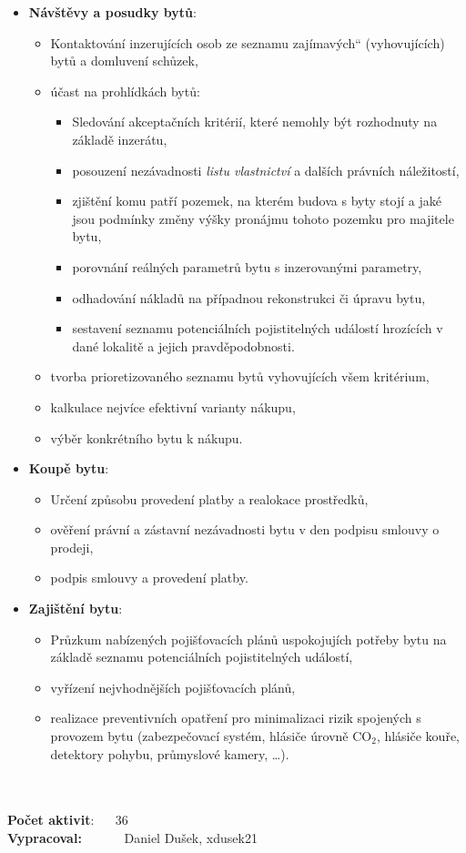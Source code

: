 \documentclass[a4paper,10pt]{article}
\providecommand{\uv}[1]{\quotedblbase #1\textquotedblleft}
\begin{document}
\begin{itemize}
	\item \textbf{Návštěvy a posudky bytů}:
		\begin{itemize}
			\item Kontaktování inzerujících osob ze seznamu \uv{zajímavých} (vyhovujících) bytů a domluvení schůzek,
			\item účast na prohlídkách bytů:
				\begin{itemize}
					\item Sledování akceptačních kritérií, které nemohly být rozhodnuty na základě inzerátu,
					\item posouzení nezávadnosti \textit{listu vlastnictví} a dalších právních náležitostí,
					\item zjištění komu patří pozemek, na kterém budova s byty stojí a jaké jsou podmínky změny výšky pronájmu tohoto pozemku pro majitele bytu,
					\item porovnání reálných parametrů bytu s inzerovanými parametry,
					\item odhadování nákladů na případnou rekonstrukci či úpravu bytu,
					\item sestavení seznamu potenciálních pojistitelných událostí hrozících v dané lokalitě a jejich pravděpodobnosti.
				\end{itemize} 
			\item tvorba prioretizovaného seznamu bytů vyhovujících všem kritérium, 
			\item kalkulace nejvíce efektivní varianty nákupu,
			\item výběr konkrétního bytu k nákupu.
		\end{itemize}

	\item \textbf{Koupě bytu}:
		\begin{itemize}
			\item Určení způsobu provedení platby a realokace prostředků, 
			\item ověření právní a zástavní nezávadnosti bytu v den podpisu smlouvy o prodeji,
			\item podpis smlouvy a provedení platby. 
		\end{itemize}

	\item \textbf{Zajištění bytu}:
			\begin{itemize}
			\item Průzkum nabízených pojišťovacích plánů uspokojujích potřeby bytu na základě seznamu potenciálních pojistitelných událostí, 
			\item vyřízení nejvhodnějších pojišťovacích plánů,
			\item realizace preventivních opatření pro minimalizaci rizik spojených s provozem bytu (zabezpečovací systém, hlásiče úrovně CO$_2$, hlásiče kouře, detektory pohybu, průmyslové kamery, \dots{}).
		\end{itemize}
\end{itemize}

~\\
~\\
\textbf{Počet aktivit}: ~~ 36 \\
\textbf{Vypracoval:} ~~~~~~Daniel Dušek, xdusek21
\end{document}
